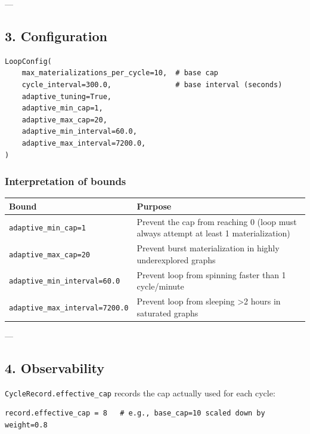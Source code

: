 ---

\subsection{3. Config\-uration}

\begin{lstlisting}
LoopConfig(
    max_materializations_per_cycle=10,  # base cap
    cycle_interval=300.0,               # base interval (seconds)
    adaptive_tuning=True,
    adaptive_min_cap=1,
    adaptive_max_cap=20,
    adaptive_min_interval=60.0,
    adaptive_max_interval=7200.0,
)
\end{lstlisting}

\subsubsection{Interp\-retation of bounds}

\begin{center}
\begin{tabularx}{\columnwidth}{|>{\raggedright\arraybackslash}X|>{\raggedright\arraybackslash}X|}
\hline
Bound & Purpose \\ \hline
\texttt{adaptive\_min\_cap=1} & Prevent the cap from reaching 0 (loop must always attempt at least 1 mater\-ialization) \\ \hline
\texttt{adaptive\_max\_cap=20} & Prevent burst mater\-ialization in highly under\-explored graphs \\ \hline
\texttt{adaptive\_min\_interval=60.0} & Prevent loop from spinning faster than 1 cycle/minute \\ \hline
\texttt{adaptive\_max\_interval=7200.0} & Prevent loop from sleeping \textgreater  2 hours in saturated graphs \\ \hline
\end{tabularx}
\end{center}

---

\subsection{4. Observ\-ability}

\texttt{CycleRecord.effective\_cap} records the cap actually used for each cycle:

\begin{lstlisting}
record.effective_cap = 8   # e.g., base_cap=10 scaled down by weight=0.8
\end{lstlisting}

